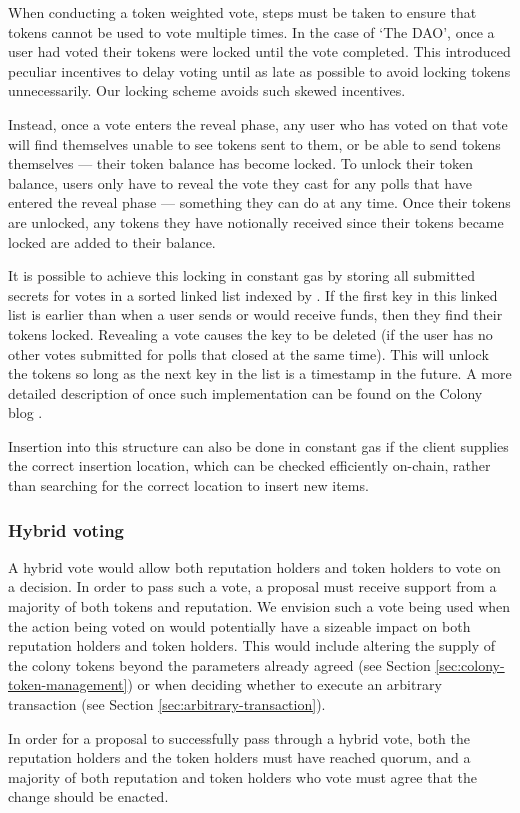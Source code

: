 When conducting a token weighted vote, steps must be taken to ensure that tokens cannot be used to vote multiple times. In the case of `The DAO', once a user had voted their tokens were locked until the vote completed. This introduced peculiar incentives to delay voting until as late as possible to avoid locking tokens unnecessarily.  Our locking scheme avoids such skewed incentives.

Instead, once a vote enters the reveal phase, any user who has voted on that vote will find themselves unable to see tokens sent to them, or be able to send tokens themselves --- their token balance has become locked. To unlock their token balance, users only have to reveal the vote they cast for any polls that have entered the reveal phase --- something they can do at any time. Once their tokens are unlocked, any tokens they have notionally received since their tokens became locked are added to their balance.

It is possible to achieve this locking in constant gas by storing all submitted secrets for votes in a sorted linked list indexed by . If the first key in this linked list is earlier than  when a user sends or would receive funds, then they find their tokens locked. Revealing a vote causes the key to be deleted (if the user has no other votes submitted for polls that closed at the same time). This will unlock the tokens so long as the next key in the list is a timestamp in the future. A more detailed description of once such implementation can be found on the Colony blog \cite{ColonyVoting}.

Insertion into this structure can also be done in constant gas if the client supplies the correct insertion location, which can be checked efficiently on-chain, rather than searching for the correct location to insert new items.

\subsubsection{Hybrid voting}
A hybrid vote would allow both reputation holders and token holders to vote on a decision. In order to pass such a vote, a proposal must receive support from a majority of both tokens and reputation. We envision such a vote being used when the action being voted on would potentially have a sizeable impact on both reputation holders and token holders. This would include altering the supply of the colony tokens beyond the parameters already agreed (see Section \ref{sec:colony-token-management}) or when deciding whether to execute an arbitrary transaction (see Section \ref{sec:arbitrary-transaction}).

In order for a proposal to successfully pass through a hybrid vote, both the reputation holders and the token holders must have reached quorum, and a majority of both reputation and token holders who vote must agree that the change should be enacted.

